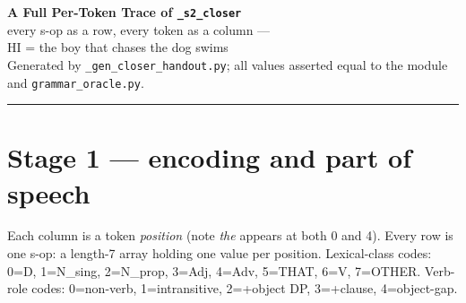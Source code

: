 \documentclass[10pt]{article}
\begin{document}
\begin{center}{\LARGE\bfseries A Full Per-Token Trace of \texttt{\_s2\_closer}}\\[3pt]
{\large every s-op as a row, every token as a column ---}\\[1pt]
{\large\ttfamily HI = the boy that chases the dog swims}\\[3pt]
{\small Generated by \texttt{\_gen\_closer\_handout.py}; all values asserted equal to the module and \texttt{grammar\_oracle.py}.}\end{center}
\hrule\vspace{4pt}
\section{Stage 1 --- encoding and part of speech}
Each column is a token \emph{position} (note \emph{the} appears at both 0 and 4). Every row is one s-op: a length-7 array holding one value per position. Lexical-class codes: 0=D, 1=N\_sing, 2=N\_prop, 3=Adj, 4=Adv, 5=THAT, 6=V, 7=OTHER. Verb-role codes: 0=non-verb, 1=intransitive, 2=+object DP, 3=+clause, 4=object-gap.
\end{document}
